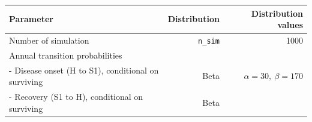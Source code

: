 \documentclass[]{article}
\begin{document}
\begin{longtable}[]{@{}lrr@{}}
\toprule
\begin{minipage}[b]{0.32\columnwidth}\raggedright\strut
\textbf{Parameter}\strut
\end{minipage} & \begin{minipage}[b]{0.17\columnwidth}\raggedleft\strut
\textbf{Distribution}\strut
\end{minipage} & \begin{minipage}[b]{0.42\columnwidth}\raggedleft\strut
\textbf{Distribution values}\strut
\end{minipage}\tabularnewline
\midrule
\endhead
\begin{minipage}[t]{0.32\columnwidth}\raggedright\strut
Number of simulation\strut
\end{minipage} & \begin{minipage}[t]{0.17\columnwidth}\raggedleft\strut
\texttt{n\_sim}\strut
\end{minipage} & \begin{minipage}[t]{0.42\columnwidth}\raggedleft\strut
1000\strut
\end{minipage}\tabularnewline
\begin{minipage}[t]{0.32\columnwidth}\raggedright\strut
Annual transition probabilities\strut
\end{minipage} & \begin{minipage}[t]{0.17\columnwidth}\raggedleft\strut
\strut
\end{minipage} & \begin{minipage}[t]{0.42\columnwidth}\raggedleft\strut
\strut
\end{minipage}\tabularnewline
\begin{minipage}[t]{0.32\columnwidth}\raggedright\strut
- Disease onset (H to S1), conditional on surviving\strut
\end{minipage} & \begin{minipage}[t]{0.17\columnwidth}\raggedleft\strut
Beta\strut
\end{minipage} & \begin{minipage}[t]{0.42\columnwidth}\raggedleft\strut
\(\alpha=30, \ \beta=170\)\strut
\end{minipage}\tabularnewline
\begin{minipage}[t]{0.32\columnwidth}\raggedright\strut
- Recovery (S1 to H), conditional on surviving\strut
\end{minipage} & \begin{minipage}[t]{0.17\columnwidth}\raggedleft\strut
Beta\strut
\end{minipage} & \begin{minipage}[t]{0.42\columnwidth}\raggedleft\strut

\end{minipage}
\end{longtable}
\end{document}
